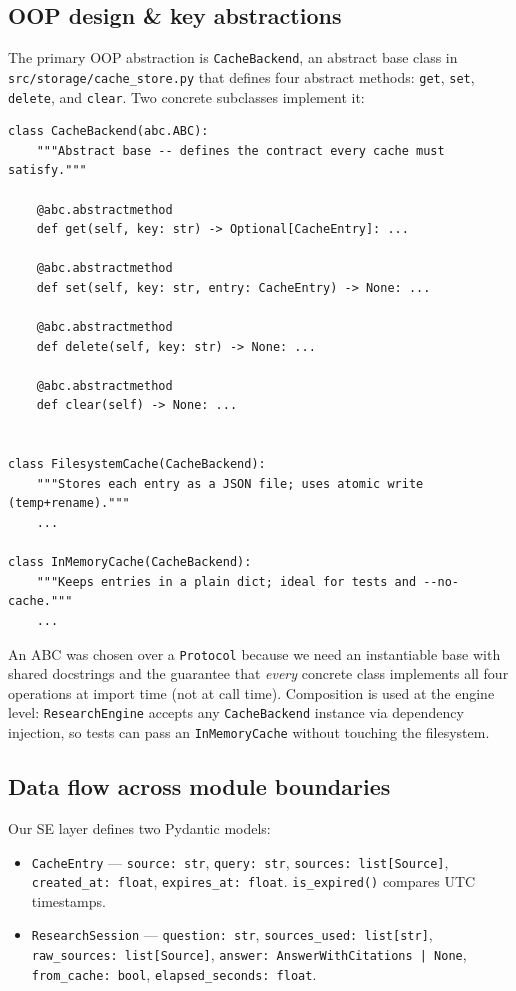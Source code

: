 \documentclass[11pt,a4paper]{article}
\begin{document}
\subsection{OOP design \& key abstractions}

The primary OOP abstraction is \texttt{CacheBackend}, an abstract base class in \texttt{src/storage/cache\_store.py} that defines four abstract methods: \texttt{get}, \texttt{set}, \texttt{delete}, and \texttt{clear}. Two concrete subclasses implement it:

\begin{lstlisting}[style=python]
class CacheBackend(abc.ABC):
    """Abstract base -- defines the contract every cache must satisfy."""

    @abc.abstractmethod
    def get(self, key: str) -> Optional[CacheEntry]: ...

    @abc.abstractmethod
    def set(self, key: str, entry: CacheEntry) -> None: ...

    @abc.abstractmethod
    def delete(self, key: str) -> None: ...

    @abc.abstractmethod
    def clear(self) -> None: ...


class FilesystemCache(CacheBackend):
    """Stores each entry as a JSON file; uses atomic write (temp+rename)."""
    ...

class InMemoryCache(CacheBackend):
    """Keeps entries in a plain dict; ideal for tests and --no-cache."""
    ...
\end{lstlisting}

An ABC was chosen over a \texttt{Protocol} because we need an instantiable base with shared docstrings and the guarantee that \emph{every} concrete class implements all four operations at import time (not at call time). Composition is used at the engine level: \texttt{ResearchEngine} accepts any \texttt{CacheBackend} instance via dependency injection, so tests can pass an \texttt{InMemoryCache} without touching the filesystem.

\subsection{Data flow across module boundaries}

Our SE layer defines two Pydantic models:
\begin{itemize}[noitemsep]
  \item \texttt{CacheEntry} --- \texttt{source: str}, \texttt{query: str}, \texttt{sources: list[Source]}, \texttt{created\_at: float}, \texttt{expires\_at: float}. \texttt{is\_expired()} compares UTC timestamps.
  \item \texttt{ResearchSession} --- \texttt{question: str}, \texttt{sources\_used: list[str]}, \texttt{raw\_sources: list[Source]}, \texttt{answer: AnswerWithCitations | None}, \texttt{from\_cache: bool}, \texttt{elapsed\_seconds: float}.
\end{itemize}
\end{document}
